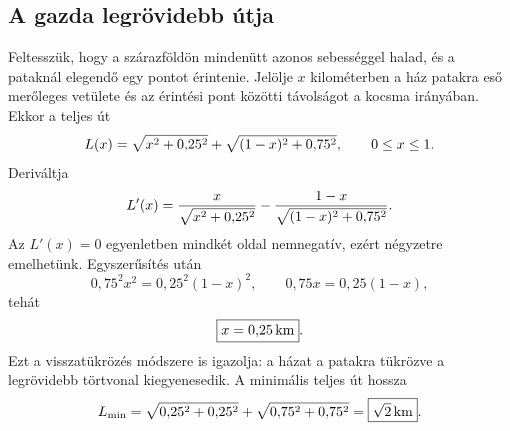 \documentclass{szb-solution}
\begin{document}
\subsection{A gazda legrövidebb útja}

Feltesszük, hogy a szárazföldön mindenütt azonos sebességgel halad, és a
pataknál elegendő egy pontot érintenie. Jelölje $x$ kilométerben a ház
patakra eső merőleges vetülete és az érintési pont közötti távolságot a
kocsma irányában. Ekkor a teljes út
$$
  L(x)=\sqrt{x^2+0{,}25^2}
       +\sqrt{(1-x)^2+0{,}75^2},
  \qquad 0\leq x\leq1
  \text.
$$
Deriváltja
$$
  L'(x)=\frac{x}{\sqrt{x^2+0{,}25^2}}
       -\frac{1-x}{\sqrt{(1-x)^2+0{,}75^2}}
  \text.
$$
Az $L'(x)=0$ egyenletben mindkét oldal nemnegatív, ezért négyzetre emelhetünk.
Egyszerűsítés után
$$
  0{,}75^2x^2=0{,}25^2(1-x)^2,
  \qquad
  0{,}75x=0{,}25(1-x),
$$
tehát
$$
  \boxed{x=0{,}25\,\mathrm{km}}
  \text.
$$
Ezt a visszatükrözés módszere is igazolja: a házat a patakra tükrözve a
legrövidebb törtvonal kiegyenesedik. A minimális teljes út hossza
$$
  L_{\min}
  =\sqrt{0{,}25^2+0{,}25^2}
   +\sqrt{0{,}75^2+0{,}75^2}
  =\boxed{\sqrt2\,\mathrm{km}}
  \text.
$$
\end{document}
